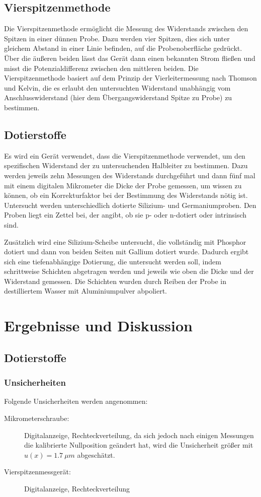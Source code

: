 \documentclass[
	a4paper,
	12pt,
	pagesize,
	ngerman
]{scrartcl}
\begin{document}
	\subsection{Vierspitzenmethode}
	Die Vierspitzenmethode ermöglicht die Messung des Widerstands zwischen den Spitzen in einer dünnen Probe.
	Dazu werden vier Spitzen, dies sich unter gleichem Abstand in einer Linie befinden, auf die Probenoberfläche gedrückt.
	Über die äußeren beiden lässt das Gerät dann einen bekannten Strom fließen und misst die Potenzialdifferenz zwischen den mittleren beiden.
	Die Vierspitzenmethode basiert auf dem Prinzip der Vierleitermessung nach Thomson und Kelvin, die es erlaubt den untersuchten Widerstand unabhängig vom Anschlusswiderstand (hier dem Übergangswiderstand Spitze zu Probe) zu bestimmen.

	\subsection{Dotierstoffe}
	Es wird ein Gerät verwendet, dass die Vierspitzenmethode verwendet, um den spezifischen Widerstand der zu untersuchenden Halbleiter zu bestimmen.
	Dazu werden jeweils zehn Messungen des Widerstands durchgeführt und dann fünf mal mit einem digitalen Mikrometer die Dicke der Probe gemessen, um wissen zu können, ob ein Korrekturfaktor bei der Bestimmung des Widerstands nötig ist.
	Untersucht werden unterschiedlich dotierte Silizium- und Germaniumproben.
	Den Proben liegt ein Zettel bei, der angibt, ob sie p- oder n-dotiert oder intrinsisch sind.

	Zusätzlich wird eine Silizium-Scheibe untersucht, die vollständig mit Phosphor dotiert und dann von beiden Seiten mit Gallium dotiert wurde.
	Dadurch ergibt sich eine tiefenabhängige Dotierung, die untersucht werden soll, indem schrittweise Schichten abgetragen werden und jeweils wie oben die Dicke und der Widerstand gemessen. %
	Die Schichten wurden durch Reiben der Probe in destilliertem Wasser mit Aluminiumpulver abpoliert.

	\section{Ergebnisse und Diskussion}

	\subsection{Dotierstoffe}
	\subsubsection{Unsicherheiten}
	Folgende Unsicherheiten werden angenommen:
	\begin{description}
		\item[Mikrometerschraube:]  Digitalanzeige, Rechteckverteilung, da sich jedoch nach einigen Messungen die kalibrierte Nullposition geändert hat, wird die Unsicherheit größer mit $u(x)=\SI{1.7}{\mu m}$ abgeschätzt.
		\item[Vierspitzenmessgerät:] Digitalanzeige, Rechteckverteilung
	\end{description}
\end{document}
